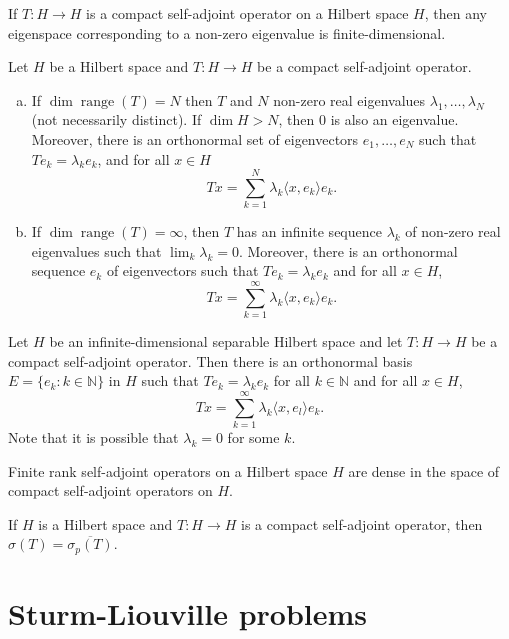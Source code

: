 \documentclass[a4paper]{article}
\newcommand{\N}{\mathbb{N}}
\newcommand{\<}{\langle}
\renewcommand{\>}{\rangle}
\newcommand{\la}{\lambda}
\newcommand{\s}{\sigma}
\DeclareMathOperator{\range}{range}
\begin{document}
\begin{prop}
  If $T:H\to H$ is a compact self-adjoint operator on a Hilbert space $H$, then any eigenspace corresponding to a non-zero eigenvalue is finite-dimensional.
\end{prop}

\begin{thm}
  Let $H$ be a Hilbert space and $T:H\to H$ be a compact self-adjoint operator.
  \begin{enumerate}[(a)]
    \item If $\dim\range(T)=N$ then $T$ and $N$ non-zero real eigenvalues $\la_1,\ldots,\la_N$ (not necessarily distinct). If $\dim H>N$, then $0$ is also an eigenvalue. Moreover, there is an orthonormal set of eigenvectors $e_1,\ldots,e_N$ such that $Te_k=\la_k e_k$, and for all $x\in H$
      $$ Tx = \sum_{k=1}^N\la_k\<x,e_k\>e_k.$$
    \item If $\dim\range(T)=\infty$, then $T$ has an infinite sequence $\la_k$ of non-zero real eigenvalues such that $\lim_k\la_k=0$. Moreover, there is an orthonormal sequence $e_k$ of eigenvectors such that $Te_k=\la_ke_k$ and for all $x\in H$,
      $$Tx = \sum_{k=1}^\infty \la_k\<x,e_k\>e_k.$$
  \end{enumerate}
\end{thm}

\begin{prop}
  Let $H$ be an infinite-dimensional separable Hilbert space and let $T:H\to H$ be a compact self-adjoint operator. Then there is an orthonormal basis $E=\{e_k:k\in\N\}$ in $H$ such that $Te_k=\la_ke_k$ for all $k\in\N$ and for all $x\in H$,
  $$Tx  =\sum_{k=1}^\infty\la_k\<x,e_l\>e_k.$$
  Note that it is possible that $\la_k=0$ for some $k$.
\end{prop}

\begin{prop}
  Finite rank self-adjoint operators on a Hilbert space $H$ are dense in the space of compact self-adjoint operators on $H$.
\end{prop}

\begin{thm}
  If $H$ is a Hilbert space and $T:H\to H$ is a compact self-adjoint operator, then $\s(T)=\overline{\s_p(T)}$.
\end{thm}

\section{Sturm-Liouville problems}
\end{document}
